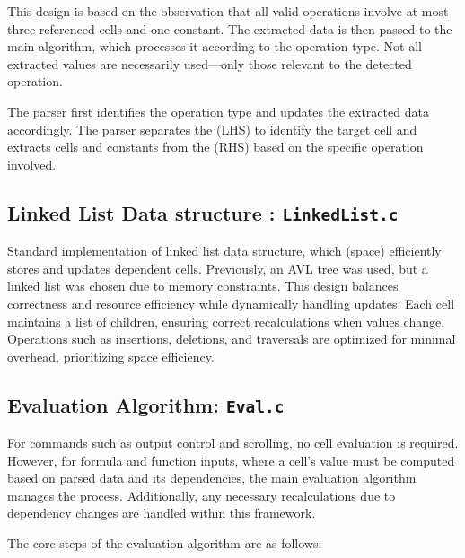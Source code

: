 \documentclass{report}
\begin{document}
This design is based on the observation that all valid operations involve at most three referenced cells and one constant. The extracted data is then passed to the main algorithm, which processes it according to the operation type. Not all extracted values are necessarily used—only those relevant to the detected operation.

The parser first identifies the operation type and updates the extracted data accordingly. The parser separates the (LHS) to identify the target cell and extracts cells and constants from the (RHS) based on the specific operation involved.


\subsection*{Linked List Data structure : \texttt{LinkedList.c}}
Standard implementation of linked list data structure, which (space) efficiently stores and updates dependent cells. Previously, an AVL tree was used, but a linked list was chosen due to memory constraints. This design balances correctness and resource efficiency while dynamically handling updates. Each cell maintains a list of children, ensuring correct recalculations when values change. Operations such as insertions, deletions, and traversals are optimized for minimal overhead, prioritizing space efficiency. 

\subsection*{Evaluation Algorithm: \texttt{Eval.c}}
For commands such as output control and scrolling, no cell evaluation is required. However, for formula and function inputs, where a cell's value must be computed based on parsed data and its dependencies, the main evaluation algorithm manages the process. Additionally, any necessary recalculations due to dependency changes are handled within this framework.

The core steps of the evaluation algorithm are as follows:
\end{document}
